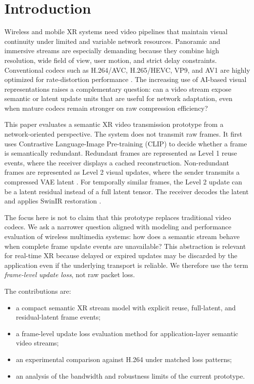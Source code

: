 \documentclass[conference]{IEEEtran}
\begin{document}
\section{Introduction}

Wireless and mobile XR systems need video pipelines that maintain visual continuity under limited and variable network resources. Panoramic and immersive streams are especially demanding because they combine high resolution, wide field of view, user motion, and strict delay constraints. Conventional codecs such as H.264/AVC, H.265/HEVC, VP9, and AV1 are highly optimized for rate-distortion performance \cite{wiegand2003overview,sullivan2012overview,mukherjee2015vp9}. The increasing use of AI-based visual representations raises a complementary question: can a video stream expose semantic or latent update units that are useful for network adaptation, even when mature codecs remain stronger on raw compression efficiency?

This paper evaluates a semantic XR video transmission prototype from a network-oriented perspective. The system does not transmit raw frames. It first uses Contrastive Language-Image Pre-training (CLIP) \cite{radford2021learning} to decide whether a frame is semantically redundant. Redundant frames are represented as Level 1 reuse events, where the receiver displays a cached reconstruction. Non-redundant frames are represented as Level 2 visual updates, where the sender transmits a compressed VAE latent \cite{kingma2014auto}. For temporally similar frames, the Level 2 update can be a latent residual instead of a full latent tensor. The receiver decodes the latent and applies SwinIR restoration \cite{liang2021swinir}.

The focus here is not to claim that this prototype replaces traditional video codecs. We ask a narrower question aligned with modeling and performance evaluation of wireless multimedia systems: how does a semantic stream behave when complete frame update events are unavailable? This abstraction is relevant for real-time XR because delayed or expired updates may be discarded by the application even if the underlying transport is reliable. We therefore use the term \emph{frame-level update loss}, not raw packet loss.

The contributions are:
\begin{itemize}
    \item a compact semantic XR stream model with explicit reuse, full-latent, and residual-latent frame events;
    \item a frame-level update loss evaluation method for application-layer semantic video streams;
    \item an experimental comparison against H.264 under matched loss patterns;
    \item an analysis of the bandwidth and robustness limits of the current prototype.
\end{itemize}
\end{document}
